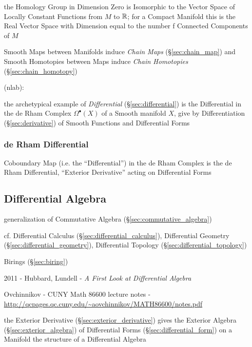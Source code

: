 the Homology Group in Dimension Zero is Isomorphic to the Vector Space of
Locally Constant Functions from $M$ to $\mathbb{R}$; for a Compact Manifold this is
the Real Vector Space with Dimension equal to the number f Connected Components
of $M$

Smooth Maps between Manifolds induce \emph{Chain Maps} (\S\ref{sec:chain_map})
and Smooth Homotopies between Maps induce \emph{Chain Homotopies}
(\S\ref{sec:chain_homotopy})


(nlab):

the archetypical example of \emph{Differential} (\S\ref{sec:differential}) is
the Differential in the de Rham Complex $\Omega^\bullet(X)$ of a Smooth manifold
$X$, give by Differentiation (\S\ref{sec:derivative}) of Smooth Functions and
Differential Forms



\subsubsection{de Rham Differential}\label{sec:derham_differential}

Coboundary Map (i.e. the ``Differential'') in the de Rham Complex is the de Rham
Differential, ``Exterior Derivative'' acting on Differential Forms



\subsection{Differential Algebra}\label{sec:differential_algebra}

generalization of Commutative Algebra (\S\ref{sec:commutative_algebra})

cf. Differential Calculus (\S\ref{sec:differential_calculus}), Differential
Geometry (\S\ref{sec:differential_geometry}), Differential Topology
(\S\ref{sec:differential_topology})

Birings (\S\ref{sec:biring})

2011 - Hubbard, Lundell - \emph{A First Look at Differential Algebra}

Ovchinnikov - CUNY Math 86600 lecture notes -
\url{http://qcpages.qc.cuny.edu/~aovchinnikov/MATH86600/notes.pdf}

the Exterior Derivative (\S\ref{sec:exterior_derivative}) gives the Exterior
Algebra (\S\ref{sec:exterior_algebra}) of Differential Forms
(\S\ref{sec:differential_form}) on a Manifold the structure of a Differential
Algebra



